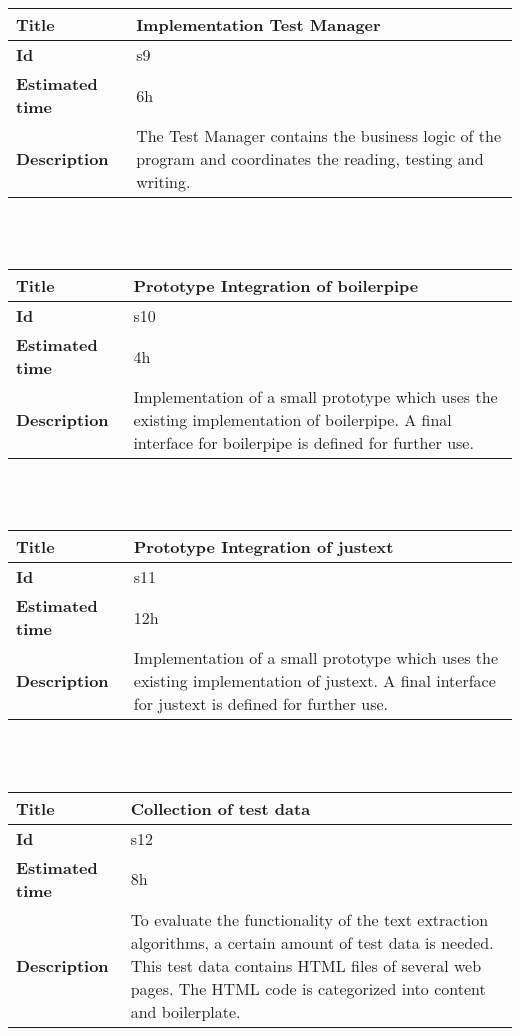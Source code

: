             \begin{tabular}{ | p{4cm} | p{10cm} |}
    \hline
    \textbf{Title} & Implementation Test Manager \\ \hline
    \textbf{Id} & s9\\ \hline
    \textbf{Estimated time} & 6h \\ \hline
    \textbf{Description} & The Test Manager contains the business logic of the program and coordinates the reading, testing and writing.\\ 
    \hline
    \end{tabular} \\\\


    \begin{tabular}{ | p{4cm} | p{10cm} |}
    \hline
    \textbf{Title} & Prototype Integration of boilerpipe\\ \hline
    \textbf{Id} & s10\\ \hline
    \textbf{Estimated time} & 4h \\ \hline
    \textbf{Description} &  Implementation of a small prototype which uses the existing implementation of boilerpipe. A final interface for boilerpipe is defined for further use.\\ 
    \hline
    \end{tabular} \\\\

    \begin{tabular}{ | p{4cm} | p{10cm} |}
    \hline
    \textbf{Title} & Prototype Integration of justext\\ \hline
    \textbf{Id} & s11 \\ \hline
    \textbf{Estimated time} & 12h \\ \hline
    \textbf{Description} &  Implementation of a small prototype which uses the existing implementation of justext. A final interface for justext is defined for further use. \\ 
    \hline
    \end{tabular} \\\\


    \begin{tabular}{ | p{4cm} | p{10cm} |}
    \hline
    \textbf{Title} & Collection of test data\\ \hline
    \textbf{Id} & s12\\ \hline
    \textbf{Estimated time} & 8h \\ \hline
    \textbf{Description} &  To evaluate the functionality of the text extraction algorithms, a certain amount of test data is needed. This test data contains HTML files of several web pages. The HTML code is categorized into content and boilerplate.\\ 
    \hline
    \end{tabular} \\\\




